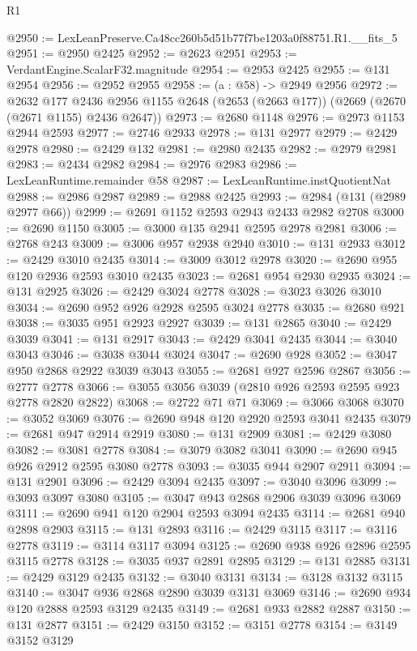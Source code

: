 \begin{lexlean}{R1}
\begin{coremodule}
@2950 := LexLeanPreserve.Ca48cc260b5d51b77f7be1203a0f88751.R1.__fits_5
@2951 := @2950 @2425
@2952 := @2623 @2951
@2953 := VerdantEngine.ScalarF32.magnitude
@2954 := @2953 @2425
@2955 := @131 @2954
@2956 := @2952 @2955
@2958 := (a : @58) -> @2949 @2956
@2972 := @2632
    @177
    @2436
    @2956
    @1155
    @2648
    (@2653 (@2663 @177))
    (@2669 (@2670 (@2671 @1155) @2436 @2647))
@2973 := @2680 @1148
@2976 := @2973 @1153 @2944 @2593
@2977 := @2746 @2933
@2978 := @131 @2977
@2979 := @2429 @2978
@2980 := @2429 @132
@2981 := @2980 @2435
@2982 := @2979 @2981
@2983 := @2434 @2982
@2984 := @2976 @2983
@2986 := LexLeanRuntime.remainder @58
@2987 := LexLeanRuntime.instQuotientNat
@2988 := @2986 @2987
@2989 := @2988 @2425
@2993 := @2984 (@131 (@2989 @2977 @66))
@2999 := @2691 @1152 @2593 @2943 @2433 @2982 @2708
@3000 := @2690 @1150
@3005 := @3000 @135 @2941 @2595 @2978 @2981
@3006 := @2768 @243
@3009 := @3006 @957 @2938 @2940
@3010 := @131 @2933
@3012 := @2429 @3010 @2435
@3014 := @3009 @3012 @2978
@3020 := @2690 @955 @120 @2936 @2593 @3010 @2435
@3023 := @2681 @954 @2930 @2935
@3024 := @131 @2925
@3026 := @2429 @3024 @2778
@3028 := @3023 @3026 @3010
@3034 := @2690 @952 @926 @2928 @2595 @3024 @2778
@3035 := @2680 @921
@3038 := @3035 @951 @2923 @2927
@3039 := @131 @2865
@3040 := @2429 @3039
@3041 := @131 @2917
@3043 := @2429 @3041 @2435
@3044 := @3040 @3043
@3046 := @3038 @3044 @3024
@3047 := @2690 @928
@3052 := @3047 @950 @2868 @2922 @3039 @3043
@3055 := @2681 @927 @2596 @2867
@3056 := @2777 @2778
@3066 := @3055 @3056 @3039 (@2810 @926 @2593 @2595 @923 @2778 @2820 @2822)
@3068 := @2722 @71 @71
@3069 := @3066 @3068
@3070 := @3052 @3069
@3076 := @2690 @948 @120 @2920 @2593 @3041 @2435
@3079 := @2681 @947 @2914 @2919
@3080 := @131 @2909
@3081 := @2429 @3080
@3082 := @3081 @2778
@3084 := @3079 @3082 @3041
@3090 := @2690 @945 @926 @2912 @2595 @3080 @2778
@3093 := @3035 @944 @2907 @2911
@3094 := @131 @2901
@3096 := @2429 @3094 @2435
@3097 := @3040 @3096
@3099 := @3093 @3097 @3080
@3105 := @3047 @943 @2868 @2906 @3039 @3096 @3069
@3111 := @2690 @941 @120 @2904 @2593 @3094 @2435
@3114 := @2681 @940 @2898 @2903
@3115 := @131 @2893
@3116 := @2429 @3115
@3117 := @3116 @2778
@3119 := @3114 @3117 @3094
@3125 := @2690 @938 @926 @2896 @2595 @3115 @2778
@3128 := @3035 @937 @2891 @2895
@3129 := @131 @2885
@3131 := @2429 @3129 @2435
@3132 := @3040 @3131
@3134 := @3128 @3132 @3115
@3140 := @3047 @936 @2868 @2890 @3039 @3131 @3069
@3146 := @2690 @934 @120 @2888 @2593 @3129 @2435
@3149 := @2681 @933 @2882 @2887
@3150 := @131 @2877
@3151 := @2429 @3150
@3152 := @3151 @2778
@3154 := @3149 @3152 @3129

\end{coremodule}
\end{lexlean}
